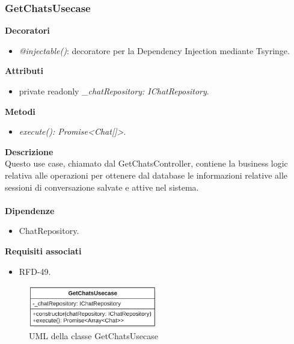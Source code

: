 \subsubsection{GetChatsUsecase}
\textbf{Decoratori}
\begin{itemize}
    \item \textit{@injectable()}: decoratore per la Dependency Injection mediante Tsyringe.
\end{itemize}
\textbf{Attributi}
\begin{itemize}
    \item private readonly \textit{\_chatRepository: IChatRepository}.
\end{itemize}
\textbf{Metodi}
\begin{itemize}
    \item \textit{execute(): Promise<Chat[]>}.
\end{itemize}
\textbf{Descrizione}\\
Questo use case, chiamato dal GetChatsController, contiene la business logic relativa alle operazioni per ottenere dal database le informazioni relative alle sessioni di conversazione salvate e attive nel sistema.\\ \\
\textbf{Dipendenze}
\begin{itemize}
    \item ChatRepository.
\end{itemize}
\textbf{Requisiti associati}
\begin{itemize}
    \item RFD-49.
\end{itemize}

\begin{figure}[h!]
    \centering  
    \includegraphics[width=0.5\textwidth]{GetChatsUsecase.png}
    \caption{UML della classe GetChatsUsecase}
\end{figure}

